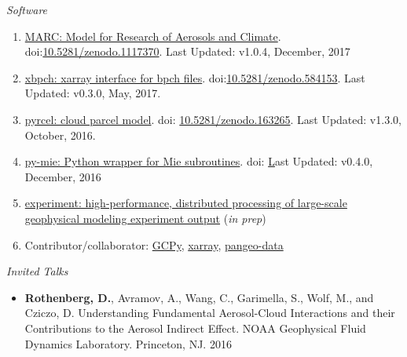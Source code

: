\documentclass[11pt,letterpaper]{article}
\newcommand{\mhead}[1]{\leavevmode\marginpar{\sffamily\footnotesize #1}}
\begin{document}
\bigskip
\emph{Software}
\medskip
\begin{enumerate}[itemindent=-10pt]

\item \href{https://github.mit.edu/marc/marc_cesm}{MARC: Model for Research of Aerosols and Climate}. doi:\href{https://doi.org/10.5281/zenodo.1117370}{10.5281/zenodo.1117370}. Last Updated: v1.0.4, December, 2017

\item \href{https://github.com/darothen/xbpch}{xbpch: xarray interface for bpch files}. doi:\href{https://doi.org/10.5281/zenodo.584153}{10.5281/zenodo.584153}. Last Updated: v0.3.0, May, 2017.

\item \href{https://github.com/darothen/pyrcel}{pyrcel: cloud parcel model}. doi: \href{https://doi.org/10.5281/zenodo.163265}{10.5281/zenodo.163265}. Last Updated: v1.3.0, October, 2016.

\item \href{https://github.com/darothen/py-mie}{py-mie: Python wrapper for Mie subroutines}. doi: \href{http://doi.org/10.5281/zenodo.192510} Last Updated: v0.4.0, December, 2016

\item \href{https://github.com/darothen/experiment}{experiment: high-performance, distributed processing of large-scale geophysical modeling experiment output} (\emph{in prep})

\item Contributor/collaborator: \href{https://bitbucket.org/gcst/gcpy/}{GCPy}, \href{https://github.com/pydata/xarray}{xarray}, \href{https://github.com/pangeo-data/pangeo}{pangeo-data}

\end{enumerate}


\bigskip
\mhead{Presentations \newline and \newline Talks}%

\emph{Invited Talks}
\medskip
\begin{itemize}[itemindent=-10pt]
\item \textbf{Rothenberg, D.}, Avramov, A., Wang, C., Garimella, S., Wolf, M., and Cziczo, D. Understanding Fundamental Aerosol-Cloud Interactions and their Contributions to the Aerosol Indirect Effect. NOAA Geophysical Fluid Dynamics Laboratory. Princeton, NJ. 2016
\end{itemize}
\end{document}
